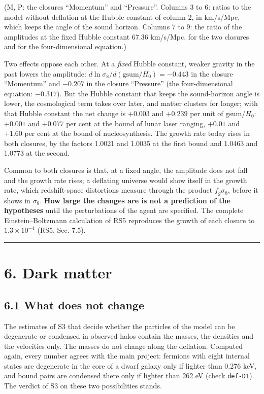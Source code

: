 \documentclass[
  10pt,
]{article}
\begin{document}
(M, P: the closures ``Momentum'' and ``Pressure''. Columns 3 to 6:
ratios to the model without deflation at the Hubble constant of column
2, in km/s/Mpc, which keeps the angle of the sound horizon. Columns 7 to
9: the ratio of the amplitudes at the fixed Hubble constant 67.36
km/s/Mpc, for the two closures and for the four-dimensional equation.)

Two effects oppose each other. At a \emph{fixed} Hubble constant, weaker
gravity in the past lowers the amplitude:
\(d\ln\sigma_8/d(\mathrm{gsum}/H_0)=-0.443\) in the closure ``Momentum''
and \(-0.207\) in the closure ``Pressure'' (the four-dimensional
equation: \(-0.317\)). But the Hubble constant that keeps the
sound-horizon angle is lower, the cosmological term takes over later,
and matter clusters for longer; with that Hubble constant the net change
is \(+0.003\) and \(+0.239\) per unit of \(\mathrm{gsum}/H_0\):
\(+0.001\) and \(+0.077\) per cent at the bound of lunar laser ranging,
\(+0.01\) and \(+1.60\) per cent at the bound of nucleosynthesis. The
growth rate today rises in both closures, by the factors 1.0021 and
1.0035 at the first bound and 1.0463 and 1.0773 at the second.

Common to both closures is that, at a fixed angle, the amplitude does
not fall and the growth rate rises; a deflating universe would show
itself in the growth rate, which redshift-space distortions measure
through the product \(f_g\sigma_8\), before it shows in \(\sigma_8\).
\textbf{How large the changes are is not a prediction of the hypotheses}
until the perturbations of the agent are specified. The complete
Einstein--Boltzmann calculation of RS5 reproduces the growth of each
closure to \(1.3\times10^{-4}\) (RS5, Sec. 7.5).

\begin{center}\rule{0.5\linewidth}{0.5pt}\end{center}

\hypertarget{dark-matter}{%
\section{6. Dark matter}\label{dark-matter}}

\hypertarget{what-does-not-change}{%
\subsection{6.1 What does not change}\label{what-does-not-change}}

The estimates of S3 that decide whether the particles of the model can
be degenerate or condensed in observed halos contain the masses, the
densities and the velocities only. The masses do not change along the
deflation. Computed again, every number agrees with the main project:
fermions with eight internal states are degenerate in the core of a
dwarf galaxy only if lighter than 0.276 keV, and bound pairs are
condensed there only if lighter than 262 eV (check \texttt{def-D1}). The
verdict of S3 on these two possibilities stands.
\end{document}

